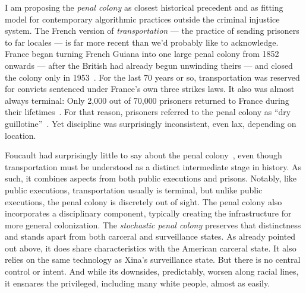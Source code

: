 I am proposing the \emph{penal colony} as closest historical precedent and as
fitting model for contemporary algorithmic practices outside the criminal
injustice system. The French version of \emph{transportation} --- the practice
of sending prisoners to far locales --- is far more recent than we'd probably
like to acknowledge. France began turning French Guiana into one large penal
colony from 1852 onwards --- after the British had already begun unwinding
theirs --- and closed the colony only in
1953~\cite{Aldrich2010,Anderson2018,Spierenburg2009}. For the last 70 years or
so, transportation was reserved for convicts sentenced under France's own three
strikes laws. It also was almost always terminal: Only 2,000 out of 70,000
prisoners returned to France during their
lifetimes~\cite{WallechinskyWallace1978}. For that reason, prisoners referred to
the penal colony as ``dry guillotine''~\cite{Furlong1913,ReneBelbenoit1938}. Yet
discipline was surprisingly inconsistent, even lax, depending on location.

Foucault had surprisingly little to say about the penal
colony~\cite{Redfield2005}, even though transportation must be understood as a
distinct intermediate stage in history. As such, it combines aspects from both
public executions and prisons. Notably, like public executions, transportation
usually is terminal, but unlike public executions, the penal colony is
discretely out of sight. The penal colony also incorporates a disciplinary
component, typically creating the infrastructure for more general colonization.
The \emph{stochastic penal colony} preserves that distinctness and stands apart
from both carceral and surveillance states. As already pointed out above, it
does share characteristics with the American carceral state. It also relies on
the same technology as Xina's surveillance state. But there is no central
control or intent. And while its downsides, predictably, worsen along racial
lines, it ensnares the privileged, including many white people, almost as
easily.


